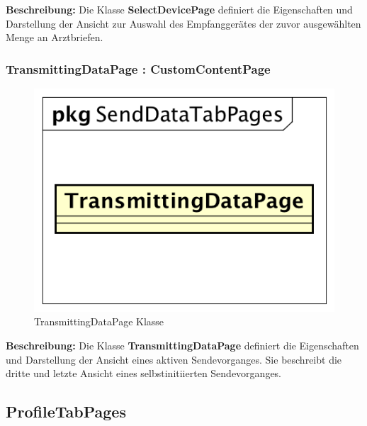 \documentclass[a4paper]{scrreprt}
\begin{document}
\textbf{Beschreibung:} Die Klasse \textbf{SelectDevicePage} definiert die Eigenschaften und Darstellung der Ansicht zur Auswahl des Empfanggerätes der zuvor ausgewählten Menge an Arztbriefen.

\subsubsection{TransmittingDataPage : CustomContentPage}
\begin{figure}[H]
\centering
\includegraphics[width=0.45\textheight]{graphics/Klassendiagramme/View/TransmittingDataPage.png}
\caption{TransmittingDataPage Klasse}
\end{figure}

\textbf{Beschreibung:} Die Klasse \textbf{TransmittingDataPage} definiert die Eigenschaften und Darstellung der Ansicht eines aktiven Sendevorganges. Sie beschreibt die dritte und letzte Ansicht eines selbstinitiierten Sendevorganges. 

\subsection{ProfileTabPages}
\end{document}
